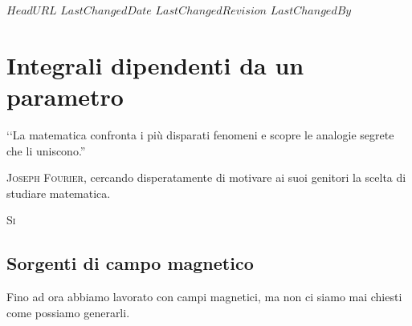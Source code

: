 \svnidlong
{$HeadURL$}
{$LastChangedDate$}
{$LastChangedRevision$}
{$LastChangedBy$}

\chapter{Integrali dipendenti da un parametro}

\begin{introduction}
	‘‘La matematica confronta i più disparati fenomeni e scopre le analogie segrete che li uniscono.''
	\begin{flushright}
		\textsc{Joseph Fourier,} cercando disperatamente di motivare ai suoi genitori la scelta di studiare matematica. %
	\end{flushright}
\end{introduction}
\lettrine[findent=1pt, nindent=0pt]{S}{i} %
\section{Sorgenti di campo magnetico}
Fino ad ora abbiamo lavorato con campi magnetici, ma non ci siamo mai chiesti come possiamo generarli.